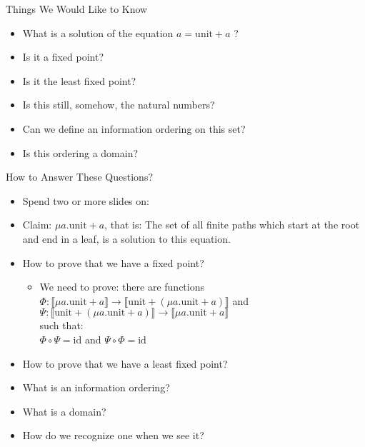 \documentclass{beamer}
\newcommand{\arr}{\rightarrow}
\begin{document}
\begin{frame}{Things We Would Like to Know}

  \begin{itemize}
    \item What is a solution of the equation $a = \text{unit} + a$ ?
    \item Is it a fixed point?
    \item Is it the least fixed point?
    \item Is this still, somehow, the natural numbers?
    \item Can we define an information ordering on this set?
    \item Is this ordering a domain?
  \end{itemize}

\end{frame}


\begin{frame}{How to Answer These Questions?}

  \begin{itemize}
    \item Spend two or more slides on:
    \item Claim: $\mu a . \text{unit} + a$, that is: The set of all finite paths which
          start at the root and end in a leaf, is a solution to this equation.
    \item How to prove that we have a fixed point?
    \begin{itemize}
      \item We need to prove: there are functions
            $\Phi : \llbracket \mu a . \text{unit} + a \rrbracket \arr \llbracket \text{unit} + (\mu a . \text{unit} + a) \rrbracket$
            and
            $\Psi : \llbracket \text{unit} + (\mu a . \text{unit} + a) \rrbracket \arr \llbracket \mu a . \text{unit} + a \rrbracket$ \\
            such that: \\
            $\Phi \circ \Psi = \text{id}$ and $\Psi \circ \Phi = \text{id}$
    \end{itemize}
    \item How to prove that we have a least fixed point?
    \item What is an information ordering?
    \item What is a domain?
    \item How do we recognize one when we see it?
  \end{itemize}

\end{frame}
\end{document}
